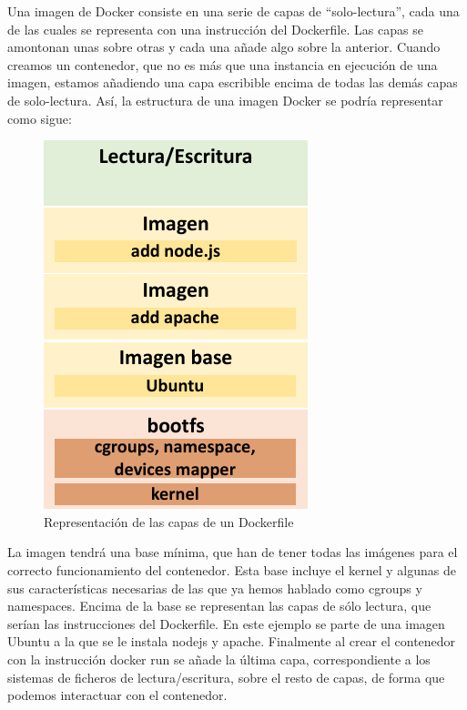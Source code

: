 	Una imagen de Docker consiste en una serie de capas de “solo-lectura”, cada una de las cuales se representa con una instrucción del Dockerfile. Las capas se amontonan unas sobre otras y cada una añade algo sobre la anterior. Cuando creamos un contenedor, que no es más que una instancia en ejecución de una imagen, estamos añadiendo una capa escribible encima de todas las demás capas de solo-lectura. Así, la estructura de una imagen Docker se podría representar como sigue: \\ 

	\begin{figure}[h]
	\centering
	\includegraphics[width=0.3 \textwidth]{../imgs/EdA/dockerfile2.png}
	\caption{Representación de las capas de un Dockerfile}
	\label{fig:dockerfile-layers}
	\end{figure}

	La imagen tendrá una base mínima, que han de tener todas las imágenes para el correcto funcionamiento del contenedor. Esta base incluye el kernel y algunas de sus características necesarias de las que ya hemos hablado como cgroups y namespaces. Encima de la base se representan las capas de sólo lectura, que serían las instrucciones del Dockerfile. En este ejemplo se parte de una imagen Ubuntu a la que se le instala nodejs y apache. Finalmente al crear el contenedor con la instrucción docker run se añade la última capa, correspondiente a los sistemas de ficheros de lectura/escritura, sobre el resto de capas, de forma que podemos interactuar con el contenedor.


